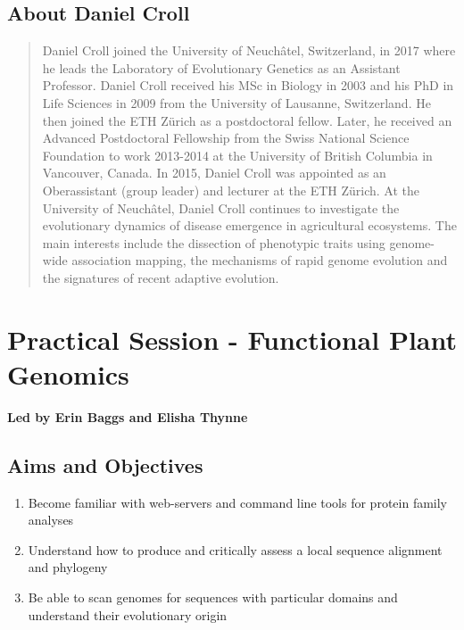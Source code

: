 \documentclass[12pt,]{book}
\providecommand{\tightlist}{%
  \setlength{\itemsep}{0pt}\setlength{\parskip}{0pt}}
\theoremstyle{definition}
\theoremstyle{definition}
\theoremstyle{remark}
\begin{document}
\subsection*{About Daniel Croll}\label{about-daniel-croll}

\begin{quote}
Daniel Croll joined the University of Neuchâtel, Switzerland, in 2017
where he leads the Laboratory of Evolutionary Genetics as an Assistant
Professor. Daniel Croll received his MSc in Biology in 2003 and his PhD
in Life Sciences in 2009 from the University of Lausanne, Switzerland.
He then joined the ETH Zürich as a postdoctoral fellow. Later, he
received an Advanced Postdoctoral Fellowship from the Swiss National
Science Foundation to work 2013-2014 at the University of British
Columbia in Vancouver, Canada. In 2015, Daniel Croll was appointed as an
Oberassistant (group leader) and lecturer at the ETH Zürich. At the
University of Neuchâtel, Daniel Croll continues to investigate the
evolutionary dynamics of disease emergence in agricultural ecosystems.
The main interests include the dissection of phenotypic traits using
genome-wide association mapping, the mechanisms of rapid genome
evolution and the signatures of recent adaptive evolution.
\end{quote}

\newpage

\section*{Practical Session - Functional Plant
Genomics}\label{practical-session---functional-plant-genomics}

\textbf{Led by Erin Baggs and Elisha Thynne}

\subsection*{Aims and Objectives}\label{aims-and-objectives-5}

\begin{enumerate}
\def\labelenumi{\arabic{enumi}.}
\tightlist
\item
  Become familiar with web-servers and command line tools for protein
  family analyses
\item
  Understand how to produce and critically assess a local sequence
  alignment and phylogeny
\item
  Be able to scan genomes for sequences with particular domains and
  understand their evolutionary origin
\end{enumerate}
\end{document}
